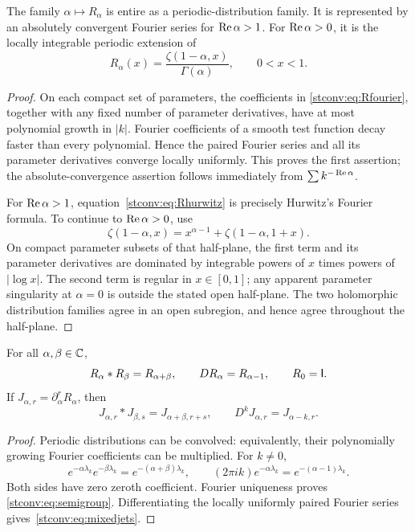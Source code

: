 \begin{lemma}\label{stconv:lem:entire}
The family $\alpha\mapsto R_\alpha$ is entire as a periodic-distribution
family. It is represented by an absolutely convergent Fourier series for
$\operatorname{Re}\alpha>1$. For $\operatorname{Re}\alpha>0$, it is the locally integrable periodic
extension of
\begin{equation}\label{stconv:eq:Rhurwitz}
 R_\alpha(x)=\frac{\zeta(1-\alpha,x)}{\Gamma(\alpha)},\qquad0<x<1.
\end{equation}
\end{lemma}
\begin{proof}
On each compact set of parameters, the coefficients in
\eqref{stconv:eq:Rfourier}, together with any fixed number of parameter derivatives,
have at most polynomial growth in $|k|$. Fourier coefficients of a smooth
test function decay faster than every polynomial. Hence the paired Fourier
series and all its parameter derivatives converge locally uniformly. This
proves the first assertion; the absolute-convergence assertion follows
immediately from $\sum k^{-\operatorname{Re}\alpha}$.

For $\operatorname{Re}\alpha>1$, equation~\eqref{stconv:eq:Rhurwitz} is precisely Hurwitz's
Fourier formula. To continue to $\operatorname{Re}\alpha>0$, use
\[
 \zeta(1-\alpha,x)=x^{\alpha-1}+\zeta(1-\alpha,1+x).
\]
On compact parameter subsets of that half-plane, the first term and its
parameter derivatives are dominated by integrable powers of $x$ times
powers of $|\log x|$. The second term is regular in $x\in[0,1]$; any
apparent parameter singularity at $\alpha=0$ is outside the stated open
half-plane. The two holomorphic distribution families agree in an open
subregion, and hence agree throughout the half-plane.
\end{proof}

\begin{theorem}\label{stconv:thm:semigroup}
For all $\alpha,\beta\in\mathbb C$,
\begin{equation}\label{stconv:eq:semigroup}
 R_\alpha*R_\beta=R_{\alpha+\beta},\qquad
 DR_\alpha=R_{\alpha-1},\qquad R_0=\mathsf I.
\end{equation}
If $J_{\alpha,r}=\partial_\alpha^rR_\alpha$, then
\begin{equation}\label{stconv:eq:mixedjets}
 J_{\alpha,r}*J_{\beta,s}=J_{\alpha+\beta,r+s},\qquad
 D^kJ_{\alpha,r}=J_{\alpha-k,r}.
\end{equation}
\end{theorem}
\begin{proof}
Periodic distributions can be convolved: equivalently, their
polynomially growing Fourier coefficients can be multiplied. For $k\ne0$,
\[
 e^{-\alpha\lambda_k}e^{-\beta\lambda_k}
 =e^{-(\alpha+\beta)\lambda_k},\qquad
 (2\pi i k)e^{-\alpha\lambda_k}=e^{-(\alpha-1)\lambda_k}.
\]
Both sides have zero zeroth coefficient. Fourier uniqueness proves
\eqref{stconv:eq:semigroup}. Differentiating the locally uniformly paired
Fourier series gives~\eqref{stconv:eq:mixedjets}.
\end{proof}

